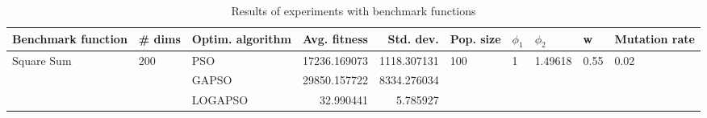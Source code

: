 \begin{table}
\centering
\caption{Results of experiments with benchmark functions}
\begin{tabular}{lllrrlllll}
\toprule
         Benchmark function &              \# dims & Optim. algorithm &  Avg. fitness &   Std. dev. &            Pop. size &         $\phi_{1}$ &               $\phi_{2}$ &                     w &         Mutation rate \\
\midrule
\multirow{3}{*}{Square Sum} & \multirow{3}{*}{200} &              PSO &  17236.169073 & 1118.307131 & \multirow{3}{*}{100} & \multirow{3}{*}{1} & \multirow{3}{*}{1.49618} & \multirow{3}{*}{0.55} & \multirow{3}{*}{0.02} \\
                            &                      &            GAPSO &  29850.157722 & 8334.276034 &                      &                    &                          &                       &                       \\
                            &                      &          LOGAPSO &     32.990441 &    5.785927 &                      &                    &                          &                       &                       \\
\bottomrule
\end{tabular}
\end{table}
